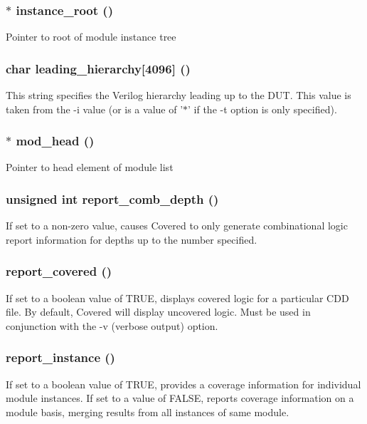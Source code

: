 \subsubsection{$\ast$ instance\_\-root ()}\label{line_8c_a0}


Pointer to root of module instance tree 
\subsubsection{\setlength{\rightskip}{0pt plus 5cm}char leading\_\-hierarchy[4096] ()}\label{line_8c_a5}


This string specifies the Verilog hierarchy leading up to the DUT. This value is taken from the -i value (or is a value of '$\ast$' if the -t option is only specified). 
\subsubsection{$\ast$ mod\_\-head ()}\label{line_8c_a1}


Pointer to head element of module list 
\subsubsection{\setlength{\rightskip}{0pt plus 5cm}unsigned int report\_\-comb\_\-depth ()}\label{line_8c_a3}


If set to a non-zero value, causes Covered to only generate combinational logic report information for depths up to the number specified. 
\subsubsection{ report\_\-covered ()}\label{line_8c_a2}


If set to a boolean value of TRUE, displays covered logic for a particular CDD file. By default, Covered will display uncovered logic. Must be used in conjunction with the -v (verbose output) option. 
\subsubsection{ report\_\-instance ()}\label{line_8c_a4}


If set to a boolean value of TRUE, provides a coverage information for individual module instances. If set to a value of FALSE, reports coverage information on a module basis, merging results from all instances of same module. 